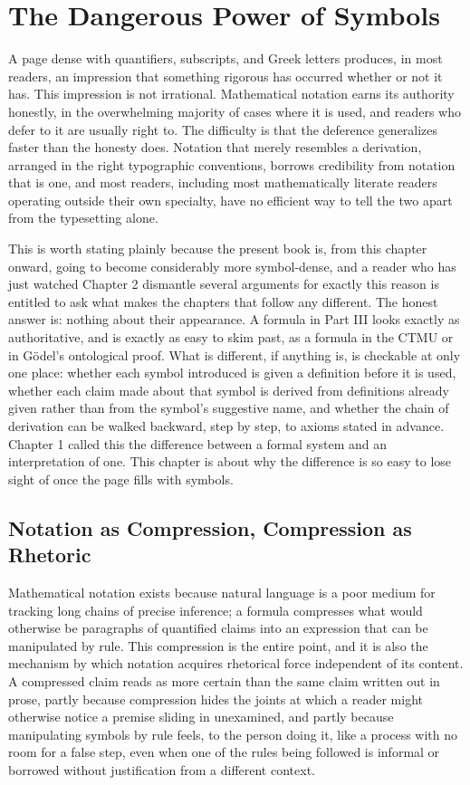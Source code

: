 \documentclass[11pt]{book}
\begin{document}
\chapter{The Dangerous Power of Symbols}

A page dense with quantifiers, subscripts, and Greek letters produces, in most readers, an impression that something rigorous has occurred whether or not it has. This impression is not irrational. Mathematical notation earns its authority honestly, in the overwhelming majority of cases where it is used, and readers who defer to it are usually right to. The difficulty is that the deference generalizes faster than the honesty does. Notation that merely resembles a derivation, arranged in the right typographic conventions, borrows credibility from notation that is one, and most readers, including most mathematically literate readers operating outside their own specialty, have no efficient way to tell the two apart from the typesetting alone.

This is worth stating plainly because the present book is, from this chapter onward, going to become considerably more symbol-dense, and a reader who has just watched Chapter 2 dismantle several arguments for exactly this reason is entitled to ask what makes the chapters that follow any different. The honest answer is: nothing about their appearance. A formula in Part III looks exactly as authoritative, and is exactly as easy to skim past, as a formula in the CTMU or in Gödel's ontological proof. What is different, if anything is, is checkable at only one place: whether each symbol introduced is given a definition before it is used, whether each claim made about that symbol is derived from definitions already given rather than from the symbol's suggestive name, and whether the chain of derivation can be walked backward, step by step, to axioms stated in advance. Chapter 1 called this the difference between a formal system and an interpretation of one. This chapter is about why the difference is so easy to lose sight of once the page fills with symbols.

\section{Notation as Compression, Compression as Rhetoric}

Mathematical notation exists because natural language is a poor medium for tracking long chains of precise inference; a formula compresses what would otherwise be paragraphs of quantified claims into an expression that can be manipulated by rule. This compression is the entire point, and it is also the mechanism by which notation acquires rhetorical force independent of its content. A compressed claim reads as more certain than the same claim written out in prose, partly because compression hides the joints at which a reader might otherwise notice a premise sliding in unexamined, and partly because manipulating symbols by rule feels, to the person doing it, like a process with no room for a false step, even when one of the rules being followed is informal or borrowed without justification from a different context.
\end{document}
